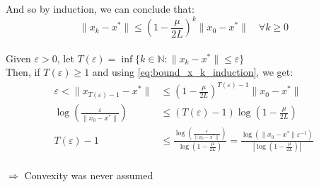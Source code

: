 \documentclass[12pt, openany]{report}
\theoremstyle{definition}
\begin{document}
And so by induction, we can conclude that:
\begin{equation}\label{eq:bound_x_k_induction}
	\|x_k - x^*\| \leq (1-\frac{\mu}{2L})^k \|x_0-x^*\| \quad \forall k \geq 0
\end{equation}
\color{red}
\color{black}\\
Given $\varepsilon > 0$, let $T(\varepsilon) = \inf\{k\in \mathbb{N} : \|x_k -x^*\|\leq \varepsilon\}$\\
Then, if $T(\varepsilon) \geq 1$ and using \eqref{eq:bound_x_k_induction}, we get:
\begin{equation}
	\begin{aligned}
		\varepsilon < \|x_{T(\varepsilon)-1} - x^*\| &\leq (1-\frac{\mu}{2L})^{T(\varepsilon)-1} \|x_0 - x^*\|\\
		\log \left(\frac{\varepsilon}{\|x_0 - x^*\|}\right) &\leq (T(\varepsilon)-1) \log \left(1-\frac{\mu}{2L}\right)\\
		T(\varepsilon)-1 &\leq \frac{\log \left(\frac{\varepsilon}{\|x_0 - x^*\|}\right)}{\log \left(1-\frac{\mu}{2L}\right)} = \frac{\log \left(\|x_0 - x^*\|\varepsilon^{-1}\right)}{|\log \left(1-\frac{\mu}{2L}\right)|}
	\end{aligned}
\end{equation}
\color{red}
\color{black}\\
$\Longrightarrow$ Convexity was never assumed
\end{document}
